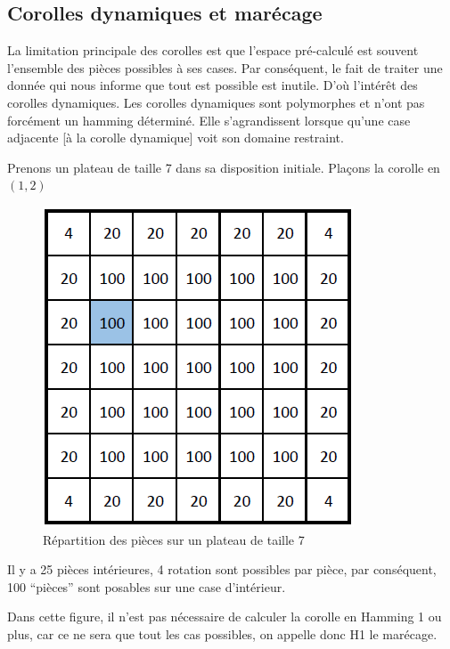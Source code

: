 	\subsection{Corolles dynamiques et marécage}
	
	La limitation principale des corolles est que l'espace pré-calculé est souvent l'ensemble des pièces possibles à ses cases. Par conséquent, le fait de traiter une donnée qui nous informe que tout est possible est inutile. D'où l'intérêt des corolles dynamiques. Les corolles dynamiques sont polymorphes et n'ont pas forcément un hamming déterminé. Elle s'agrandissent lorsque qu'une case adjacente [à la corolle dynamique] voit son domaine restraint.
	
	\begin{exmp}
		Prenons un plateau de taille 7 dans sa disposition initiale. Plaçons la corolle en $(1,2)$
		
		\begin{figure}[H]
			\centering
			\includegraphics{images/corolle_dynamique}
			\caption{Répartition des pièces sur un plateau de taille 7}
			\label{fig:corolle_dynamique}
		\end{figure}
		
		\begin{note}
			 Il y a 25 pièces intérieures, 4 rotation sont possibles par pièce, par conséquent, 100 \enquote{pièces} sont posables sur une case d'intérieur.
		\end{note}
		
		Dans cette figure, il n'est pas nécessaire de calculer la corolle en Hamming 1 ou plus, car ce ne sera que tout les cas possibles, on appelle donc H1 le marécage.
		

\end{exmp}

